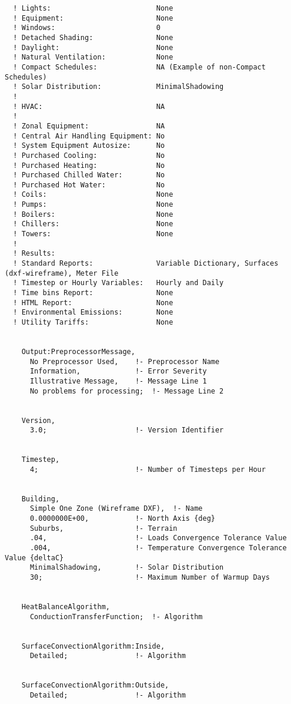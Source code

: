 \begin{lstlisting}
  ! Lights:                         None
  ! Equipment:                      None
  ! Windows:                        0
  ! Detached Shading:               None
  ! Daylight:                       None
  ! Natural Ventilation:            None
  ! Compact Schedules:              NA (Example of non-Compact Schedules)
  ! Solar Distribution:             MinimalShadowing
  !
  ! HVAC:                           NA
  !
  ! Zonal Equipment:                NA
  ! Central Air Handling Equipment: No
  ! System Equipment Autosize:      No
  ! Purchased Cooling:              No
  ! Purchased Heating:              No
  ! Purchased Chilled Water:        No
  ! Purchased Hot Water:            No
  ! Coils:                          None
  ! Pumps:                          None
  ! Boilers:                        None
  ! Chillers:                       None
  ! Towers:                         None
  !
  ! Results:
  ! Standard Reports:               Variable Dictionary, Surfaces (dxf-wireframe), Meter File
  ! Timestep or Hourly Variables:   Hourly and Daily
  ! Time bins Report:               None
  ! HTML Report:                    None
  ! Environmental Emissions:        None
  ! Utility Tariffs:                None


    Output:PreprocessorMessage,
      No Preprocessor Used,    !- Preprocessor Name
      Information,             !- Error Severity
      Illustrative Message,    !- Message Line 1
      No problems for processing;  !- Message Line 2


    Version,
      3.0;                     !- Version Identifier


    Timestep,
      4;                       !- Number of Timesteps per Hour


    Building,
      Simple One Zone (Wireframe DXF),  !- Name
      0.0000000E+00,           !- North Axis {deg}
      Suburbs,                 !- Terrain
      .04,                     !- Loads Convergence Tolerance Value
      .004,                    !- Temperature Convergence Tolerance Value {deltaC}
      MinimalShadowing,        !- Solar Distribution
      30;                      !- Maximum Number of Warmup Days


    HeatBalanceAlgorithm,
      ConductionTransferFunction;  !- Algorithm


    SurfaceConvectionAlgorithm:Inside,
      Detailed;                !- Algorithm


    SurfaceConvectionAlgorithm:Outside,
      Detailed;                !- Algorithm



\end{lstlisting}

